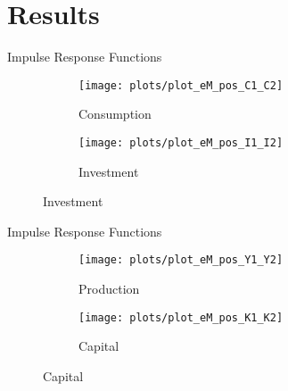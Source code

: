 \documentclass[../quali_slides.tex]{subfiles}
\begin{document}

\section{Results}


\begin{frame}{Impulse Response Functions}

\begin{figure}[h!]
	\centering
	\begin{subfigure}[b]{0.45\textwidth}
		\centering
		\texttt{[image: plots/plot\_eM\_pos\_C1\_C2]}
		\caption{\scriptsize Consumption}
		\label{fig:plot_eM_pos_C1_C2}
	\end{subfigure}
	\hspace*{0.3cm}
	\begin{subfigure}[b]{0.45\textwidth}
		\centering
		\texttt{[image: plots/plot\_eM\_pos\_I1\_I2]}
		\caption{\scriptsize Investment}
		\label{fig:plot_eM_pos_I1_I2}
	\end{subfigure}
\end{figure}

\end{frame}


\begin{frame}{Impulse Response Functions}
	
	\begin{figure}[h!]
		\centering
		\begin{subfigure}[b]{0.45\textwidth}
			\centering
			\texttt{[image: plots/plot\_eM\_pos\_Y1\_Y2]}
			\caption{\scriptsize Production}
			\label{fig:plot_eM_pos_Y1_Y2}
		\end{subfigure}
		\hspace*{0.3cm}
		\begin{subfigure}[b]{0.45\textwidth}
			\centering
			\texttt{[image: plots/plot\_eM\_pos\_K1\_K2]}
			\caption{\scriptsize Capital}
			\label{fig:plot_eM_pos_K1_K2}
		\end{subfigure}
	\end{figure}
	
\end{frame}
\end{document}
